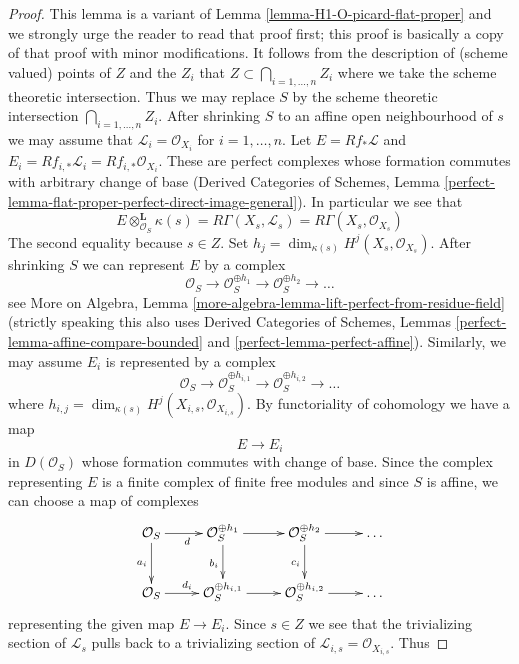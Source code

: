 \documentclass[10pt,a4paper]{amsart}
\theoremstyle{plain}
\theoremstyle{definition}
\theoremstyle{remark}
\numberwithin{equation}{subsection}
\begin{document}
\begin{proof}
This lemma is a variant of Lemma \ref{lemma-H1-O-picard-flat-proper}
and we strongly urge the reader to read that proof first; this proof
is basically a copy of that proof with minor modifications. It follows
from the description of (scheme valued) points of $Z$ and the $Z_i$
that $Z \subset \bigcap_{i = 1, \ldots, n} Z_i$ where we take the
scheme theoretic intersection. Thus we may replace $S$ by the scheme
theoretic intersection $\bigcap_{i = 1, \ldots, n} Z_i$. After shrinking
$S$ to an affine open neighbourhood of $s$ we may assume that
$\mathcal{L}_i = \mathcal{O}_{X_i}$ for $i = 1, \ldots, n$.
Let $E = Rf_*\mathcal{L}$ and
$E_i = Rf_{i, *}\mathcal{L}_i = Rf_{i, *}\mathcal{O}_{X_i}$.
These are perfect complexes whose formation commutes with arbitrary
change of base (Derived Categories of Schemes, Lemma
\ref{perfect-lemma-flat-proper-perfect-direct-image-general}).
In particular we see that
$$
E \otimes_{\mathcal{O}_S}^\mathbf{L} \kappa(s) =
R\Gamma(X_s, \mathcal{L}_s) = R\Gamma(X_s, \mathcal{O}_{X_s})
$$
The second equality because $s \in Z$. Set
$h_j = \dim_{\kappa(s)} H^j(X_s, \mathcal{O}_{X_s})$.
After shrinking $S$ we can represent $E$ by a complex
$$
\mathcal{O}_S \to \mathcal{O}_S^{\oplus h_1} \to
\mathcal{O}_S^{\oplus h_2} \to \ldots
$$
see More on Algebra, Lemma
\ref{more-algebra-lemma-lift-perfect-from-residue-field}
(strictly speaking this also uses
Derived Categories of Schemes, Lemmas
\ref{perfect-lemma-affine-compare-bounded} and
\ref{perfect-lemma-perfect-affine}). Similarly, we may assume $E_i$
is represented by a complex
$$
\mathcal{O}_S \to \mathcal{O}_S^{\oplus h_{i, 1}} \to
\mathcal{O}_S^{\oplus h_{i, 2}} \to \ldots
$$
where $h_{i, j} = \dim_{\kappa(s)} H^j(X_{i, s}, \mathcal{O}_{X_{i, s}})$.
By functoriality of cohomology we have a map
$$
E \longrightarrow E_i
$$
in $D(\mathcal{O}_S)$ whose formation commutes with change of base.
Since the complex representing $E$ is a finite complex of finite free
modules and since $S$ is affine, we can choose a map of complexes
$$
\xymatrix{
\mathcal{O}_S \ar[r]_d \ar[d]_{a_i} &
\mathcal{O}_S^{\oplus h_1} \ar[r] \ar[d]_{b_i} &
\mathcal{O}_S^{\oplus h_2} \ar[r] \ar[d]_{c_i} & \ldots \\
\mathcal{O}_S \ar[r]^{d_i} &
\mathcal{O}_S^{\oplus h_{i, 1}} \ar[r] &
\mathcal{O}_S^{\oplus h_{i, 2}} \ar[r] & \ldots
}
$$
representing the given map $E \to E_i$. Since $s \in Z$ we see that
the trivializing section of $\mathcal{L}_s$ pulls back to a trivializing
section of $\mathcal{L}_{i, s} = \mathcal{O}_{X_{i, s}}$. Thus

\end{proof}
\end{document}

